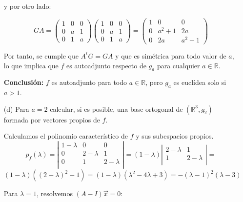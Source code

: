 \documentclass[12pt]{article}
\begin{document}
\begin{ejercicio}[4 puntos]
\begin{enumerate}
			y por otro lado:
			
			\[
			G A =
			\begin{pmatrix}
				1 & 0 & 0 \\
				0 & a & 1 \\
				0 & 1 & a
			\end{pmatrix}
			\begin{pmatrix}
				1 & 0 & 0 \\
				0 & a & 1 \\
				0 & 1 & a
			\end{pmatrix}
			=
			\begin{pmatrix}
				1 & 0 & 0 \\
				0 & a^2 + 1 & 2a \\
				0 & 2a & a^2 + 1
			\end{pmatrix}
			\]
			
			Por tanto, se cumple que \( A^t G = G A \) y que es simétrica para todo valor de \( a \), lo que implica que \( f \) es autoadjunto respecto de \( g_a \) para cualquier \( a \in \mathbb{R} \).
			
			\bigskip
			
			\noindent
			\textbf{Conclusión:} \( f \) es autoadjunto para todo \( a \in \mathbb{R} \), pero \( g_a \) es euclídea solo si \( a > 1 \).
			
			\item[(d)] Para $a = 2$ calcular, si es posible, una base ortogonal de $(\mathbb{R}^3, g_2)$ formada por vectores propios de $f$.
			
			 Calculamos el polinomio característico de \( f \) y sus subespacios propios.
			\[
			p_f(\lambda) = 
			\left| \begin{array}{ccc}
				1 - \lambda & 0 & 0 \\
				0 & 2 - \lambda & 1 \\
				0 & 1 & 2 - \lambda \\
			\end{array} \right|
			= (1 - \lambda)\left| \begin{array}{cc}
				2 - \lambda & 1 \\
				1 & 2 - \lambda \\
			\end{array} \right|
			= \]
			\[(1 - \lambda)\left( (2 - \lambda)^2 - 1 \right)
			= (1 - \lambda)\left( \lambda^2 - 4\lambda + 3 \right)
			= -(\lambda - 1)^2(\lambda - 3)
			\]
			
			\vspace{0.3cm}
			
			Para \( \lambda = 1 \), resolvemos \( (A - I)\vec{x} = 0 \):
			

\end{enumerate}
\end{ejercicio}
\end{document}
